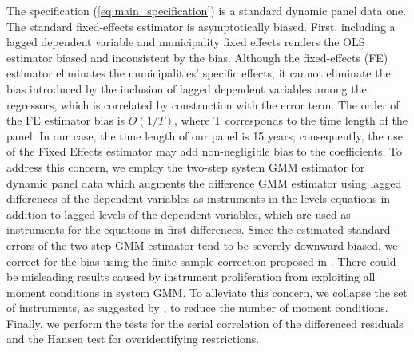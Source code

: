 The specification (\ref{eq:main_specification}) is a standard dynamic panel data one. The standard fixed-effects estimator is asymptotically biased. First, including a lagged dependent variable and municipality fixed effects renders the OLS estimator biased and inconsistent by the \textcite{nickell1981} bias. Although the fixed-effects (FE) estimator eliminates the municipalities' specific effects, it cannot eliminate the bias introduced by the inclusion of lagged dependent variables among the regressors, which is correlated by construction with the error term. The order of the FE estimator bias is $O(1/T)$, where T corresponds to the time length of the panel. In our case, the time length of our panel is 15 years; consequently, the use of the Fixed Effects estimator may add non-negligible bias to the coefficients. To address this concern, we employ the \textcite{blundell1998} two-step system GMM estimator for dynamic panel data which augments the \textcite{arellano1991} difference GMM estimator using lagged differences of the dependent variables as instruments in the levels equations in addition to lagged levels of the dependent variables, which are used as instruments for the equations in first differences. Since the estimated standard errors of the two-step GMM estimator tend to be severely downward biased, we correct for the bias using the finite sample correction proposed in \textcite{windmeijer2005}. There could be misleading results caused by instrument proliferation from exploiting all moment conditions in system GMM. To alleviate this concern, we collapse the set of instruments, as suggested by \textcite{roodman2009}, to reduce the number of moment conditions. Finally, we perform the \textcite{arellano1991} tests for the serial correlation of the differenced residuals and the Hansen test for overidentifying restrictions. 


